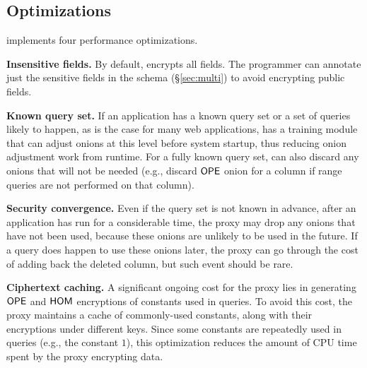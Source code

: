 \subsection{Optimizations}
\label{ss:optimize}

\name{} implements four performance optimizations.

\textbf{Insensitive fields.} By default, \name{} encrypts all fields. 
The programmer can annotate just the sensitive fields in the schema
(\S\ref{sec:multi}) to avoid encrypting public fields.

\textbf{Known query set.}  If an application has a known query set or a set of queries likely to happen, as is the case for many web applications, \name{} has a training module that can adjust onions at this level before system startup, thus reducing onion adjustment work from runtime. For a fully known query set, \name{} can also discard any onions that will not be needed (e.g., discard $\mathsf{OPE}$ onion for a column if range queries are not performed on that column).


\textbf{Security convergence.}  Even if the query set is not known in
advance, after an application has run for a considerable time, the
proxy may drop any onions that have not been used, because these
onions are unlikely to be used in the future.  If a query does happen
to use these onions later, the proxy can go through the cost of
adding back the deleted column, but such event should be rare.

\textbf{Ciphertext caching.}  A significant ongoing cost for the proxy
lies in generating $\mathsf{OPE}$ and $\mathsf{HOM}$ encryptions of constants used in
queries.  To avoid this cost, the proxy maintains a cache of
commonly-used constants, along with their encryptions under different
keys.  Since some constants are repeatedly used in queries (e.g.,
the constant $1$), this optimization reduces the amount of CPU time
spent by the proxy encrypting data.

